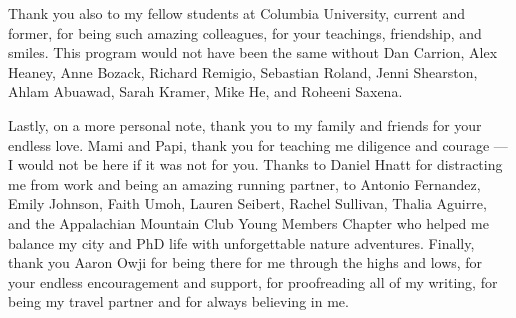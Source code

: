 Thank you also to my fellow students at Columbia University, current and former, for being such amazing colleagues, for your teachings, friendship, and smiles. This program would not have been the same without Dan Carrion, Alex Heaney, Anne Bozack, Richard Remigio, Sebastian Roland, 
Jenni Shearston, Ahlam Abuawad, Sarah Kramer, Mike He, and Roheeni Saxena. 

Lastly, on a more personal note, thank you to my family and friends for your endless love. Mami and Papi, thank you for teaching me diligence and courage --- I would not be here if it was not for you. Thanks to Daniel Hnatt for distracting me from work and being an amazing running partner, to Antonio Fernandez, Emily Johnson, Faith Umoh, Lauren Seibert, Rachel Sullivan, Thalia Aguirre, and the Appalachian Mountain Club Young Members Chapter who helped me balance my city and PhD life with unforgettable nature adventures. Finally, thank you Aaron Owji for being there for me through the highs and lows, for your endless encouragement and support, for proofreading all of my writing, for being my travel partner and for always believing in me. 

